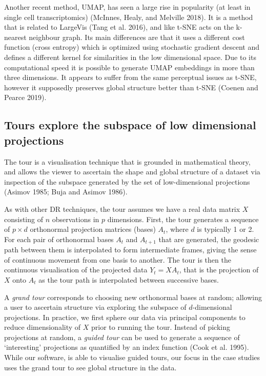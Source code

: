 \documentclass[article,notitle]{jdssv}
\begin{document}
Another recent method, UMAP, has seen a large rise in popularity (at least in
single cell transcriptomics) (McInnes, Healy, and Melville 2018). It is a method that is related to
LargeVis (Tang et al. 2016), and like t-SNE acts on the k-nearest neighbour graph.
Its main differences are that it uses a different cost function (cross entropy)
which is optimized using stochastic gradient descent and defines a different
kernel for similarities in the low dimensional space. Due to its computational
speed it is possible to generate UMAP embeddings in more than three dimensions.
It appears to suffer from the same perceptual issues as t-SNE, however it supposedly preserves global structure better than t-SNE (Coenen and Pearce 2019).

\hypertarget{tours-explore-the-subspace-of-low-dimensional-projections}{%
\subsection{Tours explore the subspace of low dimensional projections}\label{tours-explore-the-subspace-of-low-dimensional-projections}}

The tour is a visualisation technique that is grounded in
mathematical theory, and allows the viewer to ascertain
the shape and global structure of a dataset via inspection of the subspace generated by the set of low-dimensional projections (Asimov 1985; Buja and Asimov 1986).

As with other DR techniques, the tour assumes we have a real data matrix
\(X\) consisting of \(n\) observations in \(p\) dimensions. First, the tour generates
a sequence of \(p \times d\) orthonormal projection matrices (bases)
\(A_t\), where \(d\) is typically 1 or 2. For each pair of
orthonormal bases \(A_{t}\) and \(A_{t+1}\) that are generated, the geodesic
path between them is interpolated to form intermediate frames, giving the
sense of continuous movement from one basis to another. The tour is then the
continuous visualisation of the projected data \(Y_{t} = XA_{t}\), that is the
projection of \(X\) onto \(A_{t}\) as the tour path is interpolated between
successive bases.

A \emph{grand tour} corresponds to choosing new orthonormal
bases at random; allowing a user to ascertain structure via exploring the
subspace of \(d\)-dimensional projections. In practice, we first sphere
our data via principal components to reduce dimensionality of \(X\) prior to
running the tour. Instead of picking projections at
random, a \emph{guided tour} can be used to generate a sequence of `interesting'
projections as quantified by an index function (Cook et al. 1995). While our software,
 is able to visualise guided tours, our focus in the case studies
uses the grand tour to see global structure in the data.
\end{document}
